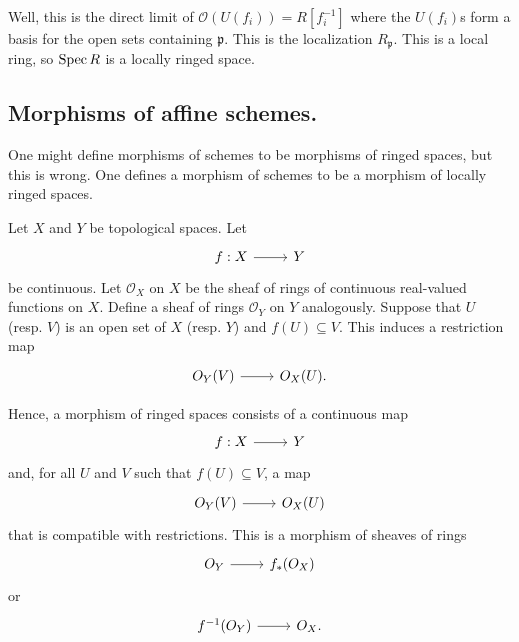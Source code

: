 \documentclass [11 pt, oneside] {article}
\begin{document}
Well, this is the direct limit of $\mathscr{O}(U({f_i}))= R[f_i ^{-1}]$ where the $U({f_i})$s form a basis for the open sets containing $\mathfrak{p}$. This is the localization $R_{\mathfrak{p}}$. This is a local ring, so $\operatorname{Spec} R$ is a locally ringed space.

\subsection{Morphisms of affine schemes.}
One might define morphisms of schemes to be morphisms of ringed spaces, but this is wrong. One defines a morphism of schemes to be a morphism of locally ringed spaces. 

Let $X$ and $Y$ be topological spaces. Let 
\[
\begin{tikzcd}
f:X\ar[r]&Y
\end{tikzcd}
\] 
be continuous. Let $\mathscr{O}_X$ on $X$ be the sheaf of rings of continuous real-valued functions on $X$. Define a sheaf of rings $\mathscr{O}_Y$ on $Y$ analogously. Suppose that $U$ (resp. $V$) is an open set of $X$ (resp. $Y$) and $f(U)\subseteq V$. This induces a restriction map 
\[
\begin{tikzcd}
\mathscr{O}_Y(V) \ar[r]& \mathscr{O}_X(U).
\end{tikzcd}
\]

Hence, a morphism of ringed spaces consists of a continuous map 
\[
\begin{tikzcd}
f:X\ar[r]&Y
\end{tikzcd}
\] 
and, for all $U$ and $V$ such that $f(U)\subseteq V$, a map 
\[
\begin{tikzcd}
\mathscr{O}_Y(V) \ar[r]& \mathscr{O}_X(U)
\end{tikzcd}
\] 
that is compatible with restrictions. This is a morphism of sheaves of rings 
\[
\begin{tikzcd}
\mathscr{O}_Y\ar[r]& f_*(\mathscr{O}_X)
\end{tikzcd}
\] 
or 
\[
\begin{tikzcd}
f^{-1}(\mathscr{O}_Y)\ar[r]& \mathscr{O}_X.
\end{tikzcd}
\] 
\end{document}
